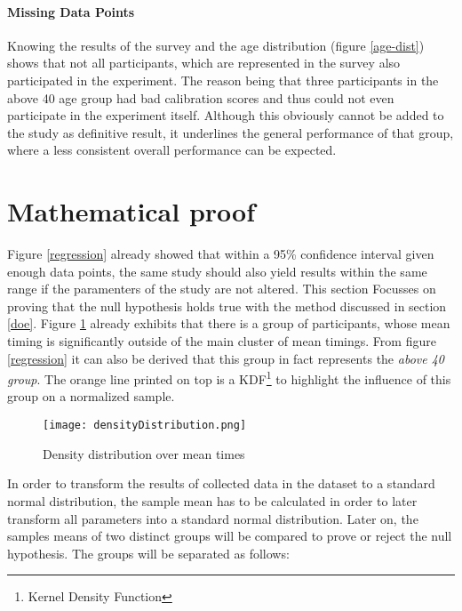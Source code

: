             \paragraph{Missing Data Points} Knowing the results of the survey and the age distribution (figure \ref*{age-dist}) shows that not all participants, which are represented in the survey also participated in the experiment. The reason being that three participants in the above 40 age group had bad calibration scores and thus could not even participate in the experiment itself. Although this obviously cannot be added to the study as definitive result, it underlines the general performance of that group, where a less consistent overall performance can be expected.

        \section{Mathematical proof}\label{mafs}

            Figure \ref*{regression} already showed that within a 95\% confidence interval given enough data points, the same study should also yield results within the same range if the paramenters of the study are not altered. This section Focusses on proving that the null hypothesis holds true with the method discussed in section \ref{doe}. Figure \ref{means-density} already exhibits that there is a group of participants, whose mean timing is significantly outside of the main cluster of mean timings. From figure \ref{regression} it can also be derived that this group in fact represents the \textit{above 40 group}. The orange line printed on top is a KDF\footnote{Kernel Density Function} to highlight the influence of this group on a normalized sample.

            \begin{figure}[h]     %
                \centering
                \texttt{[image: densityDistribution.png]}
                \caption{Density distribution over mean times}\label{means-density}
            \end{figure}

            In order to transform the results of collected data in the dataset to a standard normal distribution, the sample mean has to be calculated in order to later transform all parameters into a standard normal distribution. Later on, the samples means of two distinct groups will be compared to prove or reject the null hypothesis. The groups will be separated as follows:

